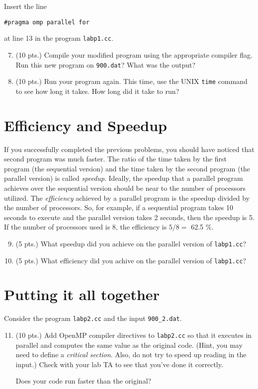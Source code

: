 \documentclass[12pt]{article}
\begin{document}
Insert the line 
\begin{verbatim}
#pragma omp parallel for
\end{verbatim}
at line 13 in the program \verb+labp1.cc+.

\begin{enumerate}
\setcounter{enumi}{6}
\item (10 pts.) Compile your modified program using the appropriate
compiler flag.  Run this new program on \verb+900.dat+?  What was the output?
\item (10 pts.) Run your program again.  This time, use the UNIX
\verb+time+ command to see how long it takes.  How long did it take to run?
\end{enumerate}

\section*{Efficiency and Speedup}
If you successfully completed the previous problems, you should have noticed that second program was much faster.  The ratio of the time taken by the first program (the sequential version) and the time taken by the second program (the parallel version) is called \emph{speedup}.  Ideally, the speedup that a parallel program achieves over the sequential version should be near to the number of processors utilized.    The \emph{efficiency} achieved by a parallel program is the speedup divided by the number of processors.   So, for example, if a 
sequential program takes 10 seconds to execute and the parallel version takes
2 seconds, then the speedup is 5.  If the number of processors used is 8, the efficiency is $5/8 = $ 62.5 \%.

\begin{enumerate}
\setcounter{enumi}{8}
\item (5 pts.) What speedup did you achieve on the parallel version of \verb+labp1.cc+?
\item (5 pts.) What efficiency did you achive on the parallel version of
\verb+labp1.cc+?

\end{enumerate}


\section*{Putting it all together}
Consider the program \verb+labp2.cc+ and the input \verb+900_2.dat+.

\begin{enumerate}
\setcounter{enumi}{10}
\item (10 pts.) Add OpenMP compiler directives to \verb+labp2.cc+ so that
it executes in parallel and computes the same value as the original 
code.  (Hint, you may need to define a \emph{critical section}.  Also, do not
try to speed up reading in the input.)   Check with your lab TA to see that you've done it correctly.

Does your code run faster than the original?  

\end{enumerate}
\end{document}

